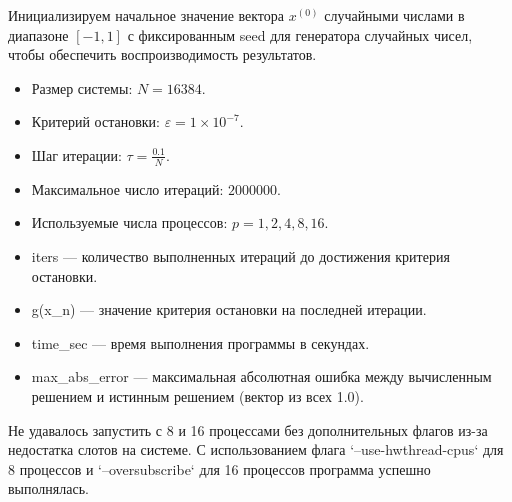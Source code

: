 \documentclass[a4paper, 14pt]{extarticle}
\begin{document}
Инициализируем начальное значение вектора $x^{(0)}$ случайными числами в диапазоне $[-1, 1]$ с фиксированным seed для генератора случайных чисел, чтобы обеспечить воспроизводимость результатов.

\begin{itemize}
    \item Размер системы: $N = 16384$.
    \item Критерий остановки: $\varepsilon = 1 \times 10^{-7}$.
    \item Шаг итерации: $\tau = \frac{0.1}{N}$.
    \item Максимальное число итераций: $2000000$.
    \item Используемые числа процессов: $p = 1, 2, 4, 8, 16$.
    \item iters --- количество выполненных итераций до достижения критерия остановки.
    \item g(x\_n) --- значение критерия остановки на последней итерации.
    \item time\_sec --- время выполнения программы в секундах.
    \item max\_abs\_error --- максимальная абсолютная ошибка между вычисленным решением и истинным решением (вектор из всех 1.0).
\end{itemize}

Не удавалось запустить с 8 и 16 процессами без дополнительных флагов из-за недостатка слотов на системе. С использованием флага `--use-hwthread-cpus` для 8 процессов и `--oversubscribe` для 16 процессов программа успешно выполнялась.
\end{document}
